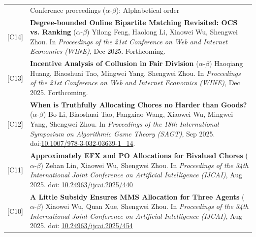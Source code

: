 \documentclass[letterpaper, 11pt]{article}
\newcommand{\headingfont}{\Large\color{OliveGreen}}
\newenvironment{SectionTable}[1]{
	\renewcommand*{\arraystretch}{1.2}
	\setlength{\tabcolsep}{8pt}
	\begin{longtable}{Rp{6.2in}} & #1 \\}
{\end{longtable}\vspace{-.7cm}}
\begin{document}
\begin{SectionTable}{\headingfont Conference proceedings \; \small\color{black}  ($\alpha$-$\beta$): Alphabetical order}

[C14] & 
\textbf{Degree-bounded Online Bipartite Matching Revisited: OCS vs. Ranking} \newline
($\alpha$-$\beta$) Yilong Feng, Haolong Li, Xiaowei Wu, Shengwei Zhou. \newline
In \textit{Proceedings of the 21st Conference on Web and Internet Economics (WINE)}, Dec 2025. Forthcoming. \\

[C13] & 
\textbf{Incentive Analysis of Collusion in Fair Division} \newline
($\alpha$-$\beta$) Haoqiang Huang, Biaoshuai Tao, Mingwei Yang, Shengwei Zhou. \newline
In \textit{Proceedings of the 21st Conference on Web and Internet Economics (WINE)}, Dec 2025. Forthcoming. \\

[C12] & 
\textbf{When is Truthfully Allocating Chores no Harder than Goods?} \newline
($\alpha$-$\beta$) Bo Li, Biaoshuai Tao, Fangxiao Wang, Xiaowei Wu, Mingwei Yang, Shengwei Zhou. \newline
In \textit{Proceedings of the 18th International Symposium on Algorithmic Game Theory (SAGT)}, Sep 2025. doi:\href{https://link.springer.com/chapter/10.1007/978-3-032-03639-1_14}{10.1007/978-3-032-03639-1\_14}.\\

[C11] & 
\textbf{Approximately EFX and PO Allocations for Bivalued Chores} \newline
($\alpha$-$\beta$) Zehan Lin, Xiaowei Wu, Shengwei Zhou. \newline
In \textit{Proceedings of the 34th International Joint Conference on Artificial Intelligence (IJCAI)}, Aug 2025. doi: \href{https://doi.org/10.24963/ijcai.2025/440}{10.24963/ijcai.2025/440} \\

[C10] & 
\textbf{A Little Subsidy Ensures MMS Allocation for Three Agents} \newline
($\alpha$-$\beta$) Xiaowei Wu, Quan Xue, Shengwei Zhou. \newline
In \textit{Proceedings of the 34th International Joint Conference on Artificial Intelligence (IJCAI)}, Aug 2025. doi: \href{https://doi.org/10.24963/ijcai.2025/454}{10.24963/ijcai.2025/454} \\


\end{SectionTable}
\end{document}

